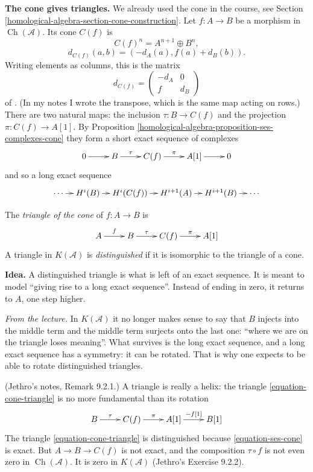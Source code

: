 \noindent
{\bf The cone gives triangles.} We
already used the cone in the course,
see Section
\ref{homological-algebra-section-cone-construction}.
Let $f:A\to B$ be a morphism in
$\operatorname{Ch}(\mathcal{A})$. Its
cone $C(f)$ is
$$
C(f)^n=A^{n+1}\oplus B^n,
$$
$$
d_{C(f)}(a,b)=(-d_A(a),f(a)+d_B(b)).
$$
Writing elements as columns, this is
the matrix
$$
d_{C(f)}=
\begin{pmatrix}
-d_A&0\\
f&d_B
\end{pmatrix}
$$
of \cite[Definition 2.15]{huybrechts-fm}.
(In my notes I wrote the transpose,
which is the same map acting on rows.)
There are two natural maps: the
inclusion $\tau:B\to C(f)$ and the
projection $\pi:C(f)\to A[1]$. By
Proposition
\ref{homological-algebra-proposition-ses-complexes-cone}
they form a short exact sequence of
complexes
\begin{equation}
\label{equation-ses-cone}
\xymatrix{
0\ar[r]
&B\ar[r]^-{\tau}
&C(f)\ar[r]^-{\pi}
&A[1]\ar[r]
&0
}
\end{equation}
and so a long exact sequence
$$
\xymatrix@C=0.9em{
\cdots\ar[r]
&H^i(B)\ar[r]
&H^i(C(f))\ar[r]
&H^{i+1}(A)\ar[r]
&H^{i+1}(B)\ar[r]
&\cdots
}
$$

\begin{definition}
\label{definition-cone-triangle}
The {\it triangle of the cone} of
$f:A\to B$ is
\begin{equation}
\label{equation-cone-triangle}
\xymatrix{
A\ar[r]^-{f}
&B\ar[r]^-{\tau}
&C(f)\ar[r]^-{\pi}
&A[1]
}
\end{equation}
A triangle in $K(\mathcal{A})$ is
{\it distinguished} if it is isomorphic
to the triangle of a cone.
\end{definition}

\noindent
{\bf Idea.} A distinguished triangle is
what is left of an exact sequence. It is
meant to model ``giving rise to a long
exact sequence''. Instead of ending in
zero, it returns to $A$, one step higher.

\medskip\noindent
{\it From the lecture.} In $K(\mathcal{A})$ it no
longer makes sense to say that $B$
injects into the middle term and the
middle term surjects onto the last one:
``where we are on the triangle loses
meaning''. What survives is the long
exact sequence, and a long exact
sequence has a symmetry: it can be
rotated. That is why one expects to be
able to rotate distinguished triangles.

\begin{remark}
\label{remark-triangle-is-helix}
(Jethro's notes, Remark 9.2.1.) A
triangle is really a helix: the triangle
\eqref{equation-cone-triangle} is no more
fundamental than its rotation
$$
\xymatrix{
B\ar[r]^-{\tau}
&C(f)\ar[r]^-{\pi}
&A[1]\ar[r]^-{-f[1]}
&B[1]
}
$$
The triangle \eqref{equation-cone-triangle}
is distinguished because
\eqref{equation-ses-cone} is exact. But
$A\to B\to C(f)$ is not exact, and the
composition $\tau\circ f$ is not even
zero in
$\operatorname{Ch}(\mathcal{A})$. It is
zero in $K(\mathcal{A})$ (Jethro's
Exercise 9.2.2).
\end{remark}

